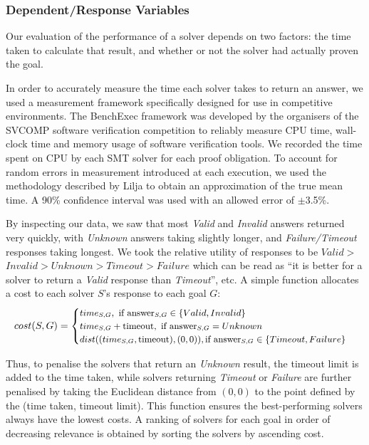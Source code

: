 

\subsubsection{Dependent/Response Variables}
\label{sec:dependant}

Our evaluation of the performance of a solver depends on two factors: the time taken to calculate that result, and whether or not the solver had actually proven the goal.

In order to accurately measure the time each solver takes to return an answer, we used a measurement framework specifically designed for use in competitive environments. The BenchExec \cite{benchexec} framework was developed by the organisers of the SVCOMP \cite{SVCOMP} software verification competition to reliably measure CPU time, wall-clock time and memory usage of software verification tools. We recorded the time spent on CPU by each SMT solver for each proof obligation. To account for random errors in measurement introduced at each execution, we used the methodology described by Lilja \cite{LiljaJ} to obtain an approximation of the true mean time. A 90\% confidence interval was used with an allowed error of $\pm$3.5\%.   

By inspecting our data, we saw that most \textit{Valid} and \textit{Invalid} answers returned very quickly, with \textit{Unknown} answers taking slightly longer, and \textit{Failure/Timeout} responses taking longest. We took the relative utility of responses to be $Valid >$ $Invalid>Unknown>Timeout>Failure$ which can be read as ``it is better for a solver to return a \textit{Valid} response than \textit{Timeout}'', etc. A simple function allocates a cost to each solver $S$'s response to each goal $G$:
\[\small
cost(S,G) = 
\begin{cases}
time_{S,G}, \text{ if answer}_{S,G} \in \lbrace Valid, Invalid \rbrace \\
time_{S,G} + \text{timeout}, \text{ if answer}_{S,G} = Unknown \\
dist((time_{S,G},\text{timeout}), (0,0)), \text{if answer}_{S,G} \in \lbrace Timeout, Failure \rbrace
\end{cases}
\]

Thus, to penalise the solvers that return an \textit{Unknown} result, the timeout limit is added to the time taken, while solvers returning \textit{Timeout} or \textit{Failure} are further penalised by taking the Euclidean distance from $(0,0)$ to the point defined by the (time taken, timeout limit). This function ensures the best-performing solvers always have the lowest costs. A ranking of solvers for each goal in order of decreasing relevance is obtained by sorting the solvers by ascending cost.

